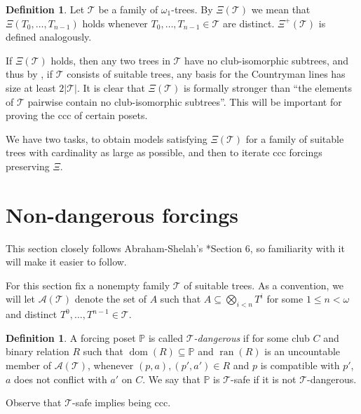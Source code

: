 \documentclass[a4paper,noamsfonts]{amsart}
\theoremstyle{definition}
\newtheorem{definition}[theorem]{Definition}
\renewcommand{\P}{\mathbb {P}}
\newcommand{\seb}{\subseteq}
\newcommand{\1}{\mathbbm{1}}
\newcommand{\T}{\mathcal{T}}
\newcommand{\prop}{\Xi}
\newcommand{\propp}{\prop^{+}}
\DeclareMathOperator{\dom}{dom}
\DeclareMathOperator{\ran}{ran}
\begin{document}
\begin{definition}
  Let $\T$ be a family of $\omega_{1}$-trees. By $\prop(\T)$ we mean
  that $\prop(T_{0},\dots,T_{n-1})$ holds whenever $T_{0},\dots,T_{n-1} \in \T$
  are distinct. $\propp(\T)$ is defined analogously.
\end{definition}

If $\prop(\T)$ holds, then any two trees in $\T$ have no club-isomorphic
subtrees, and thus by , if $\T$
consists of suitable trees, any basis for
the Countryman lines has size at least $2|\T|$. It is clear that
$\prop(\T)$ is formally stronger than ``the elements of $\T$ pairwise contain
no club-isomorphic subtrees''. This will be important for
proving the ccc of certain posets.

We have two tasks, to obtain models satisfying $\prop(\T)$ for a family of
suitable trees with cardinality as large as possible, and then
to iterate ccc forcings preserving $\prop$. 



\section{Non-dangerous forcings}\label{sec:non-dangerous}

This section closely follows Abraham-Shelah's \cite{ShelahAbraham}*{Section 6},
so familiarity with it will make it easier to follow.

For this section fix a nonempty family $\T$ of suitable trees.
As a convention, we will let $\mathcal{A}(\T)$
denote the set of $A$ such that $A \seb \bigotimes_{i <
  n}T^{i}$ for some $1 \le n < \omega$ and distinct
$T^{0},\dots,T^{n-1}\in \T$.

\begin{definition}\label{df:safe}
  A forcing poset $\P$ is called
  \emph{$\T$-dangerous} if for some club $C$ and
  binary relation $R$ such that
  $\dom(R) \seb \P$ and $\ran(R)$ is an uncountable
  member of $\mathcal{A}(\T)$,
  whenever $(p,a),(p',a') \in R$ and $p$ is compatible
  with $p'$, $a$ does not conflict with $a'$ on $C$.
  We say that $\P$ is $\T$-safe if it is not $\T$-dangerous.
\end{definition}

Observe that $\T$-safe implies being ccc.
\end{document}
